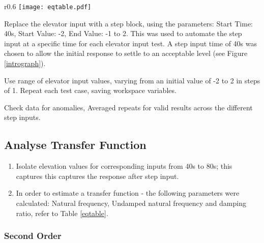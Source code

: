 \begin{enumerate}
  \item
    \parbox[t]{\dimexpr\textwidth-\leftmargin}{%
      \vspace{-3mm}
      \begin{wrapfigure}{r}{0.6\textwidth}
      \vspace{-10pt}
        \centering
\texttt{[image: eqtable.pdf]}
\label{eqtable}
\vspace{-25pt}
      \end{wrapfigure}
      Replace the elevator input with a step block, using the parameters: Start Time: 40s, Start Value: -2, End Value: -1 to 2. This was used to automate the step input at a specific time for each elevator input test. A step input time of 40s was chosen to allow the initial response to settle to an acceptable level (see Figure \ref{intrograph}).
      \vspace{3mm}
      \item Use range of elevator input values, varying from an initial value of -2 to 2 in steps of 1. Repeat each test case, saving workspace variables.
      \vspace{3mm}
      \item Check data for anomalies, Averaged repeats for valid results across the different step inputs.
    }
  \end{enumerate}

\subsection{Analyse Transfer Function}\label{analyse-transfer-function}

\begin{enumerate}

\item
  Isolate elevation values for corresponding inputs from 40s to 80s;
  this captures this captures the response after step input.
\item
  In order to estimate a transfer function - the following parameters
  were calculated: Natural frequency, Undamped natural frequency and
  damping ratio, refer to Table \ref{eqtable}.
\end{enumerate}

\subsubsection{Second Order}\label{second-order}

